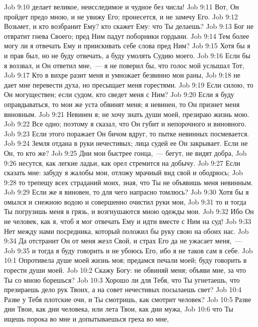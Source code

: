 \vs Job 9:10 делает великое, неисследимое и чудное без числа!
\vs Job 9:11 Вот, Он пройдет предо мною, и не увижу Его; пронесется, и не замечу Его.
\vs Job 9:12 Возьмет, и кто возбранит Ему? кто скажет Ему: что Ты делаешь?
\vs Job 9:13 Бог не отвратит гнева Своего; пред Ним падут поборники гордыни.
\vs Job 9:14 Тем более могу ли я отвечать Ему и приискивать себе слова пред Ним?
\vs Job 9:15 Хотя бы я и прав был, но не буду отвечать, а буду умолять Судию моего.
\vs Job 9:16 Если бы я воззвал, и Он ответил мне,~--- я не поверил бы, что голос мой услышал Тот,
\vs Job 9:17 Кто в вихре разит меня и умножает безвинно мои раны,
\vs Job 9:18 не дает мне перевести духа, но пресыщает меня горестями.
\vs Job 9:19 Если  силою, то Он могуществен; если судом, кто сведет меня с Ним?
\vs Job 9:20 Если я буду оправдываться, то мои же уста обвинят меня;  я невинен, то Он признет меня виновным.
\vs Job 9:21 Невинен я; не хочу знать души моей, презираю жизнь мою.
\vs Job 9:22 Все одно; поэтому я сказал, что Он губит и непорочного и виновного.
\vs Job 9:23 Если этого поражает Он бичом вдруг, то пытке невинных посмевается.
\vs Job 9:24 Земля отдана в руки нечестивых; лица судей ее Он закрывает. Если не Он, то кто же?
\vs Job 9:25 Дни мои быстрее гонца,~--- бегут, не видят добра,
\vs Job 9:26 несутся, как легкие ладьи, как орел стремится на добычу.
\vs Job 9:27 Если сказать мне: забуду я жалобы мои, отложу мрачный вид свой и ободрюсь;
\vs Job 9:28 то трепещу всех страданий моих, зная, что Ты не объявишь меня невинным.
\vs Job 9:29 Если же я виновен, то для чего напрасно томлюсь?
\vs Job 9:30 Хотя бы я омылся и снежною водою и совершенно очистил руки мои,
\vs Job 9:31 то и тогда Ты погрузишь меня в грязь, и возгнушаются мною одежды мои.
\vs Job 9:32 Ибо Он не человек, как я, чтоб я мог отвечать Ему и идти вместе с Ним на суд!
\vs Job 9:33 Нет между нами посредника, который положил бы руку свою на обоих нас.
\vs Job 9:34 Да отстранит Он от меня жезл Свой, и страх Его да не ужасает меня,~---
\vs Job 9:35 и тогда я буду говорить и не убоюсь Его, ибо я не таков сам в себе.
\vs Job 10:1 Опротивела душе моей жизнь моя; предамся печали моей; буду говорить в горести души моей.
\vs Job 10:2 Скажу Богу: не обвиняй меня; объяви мне, за что Ты со мною борешься?
\vs Job 10:3 Хорошо ли для Тебя, что Ты угнетаешь, что презираешь дело рук Твоих, а на совет нечестивых посылаешь свет?
\vs Job 10:4 Разве у Тебя плотские очи, и Ты смотришь, как смотрит человек?
\vs Job 10:5 Разве дни Твои, как дни человека, или лета Твои, как дни мужа,
\vs Job 10:6 что Ты ищешь порока во мне и допытываешься греха во мне,
